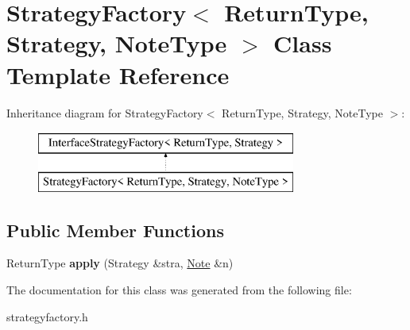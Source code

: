 \hypertarget{class_strategy_factory}{\section{Strategy\-Factory$<$ Return\-Type, Strategy, Note\-Type $>$ Class Template Reference}
\label{class_strategy_factory}
}
Inheritance diagram for Strategy\-Factory$<$ Return\-Type, Strategy, Note\-Type $>$\-:\begin{figure}[H]
\begin{center}
\leavevmode
\includegraphics[height=2.000000cm]{class_strategy_factory}
\end{center}
\end{figure}
\subsection*{Public Member Functions}
\begin{DoxyCompactItemize}
\item 
\hypertarget{class_strategy_factory_a5d5e278ab59075619df5aa563fb2b254}{Return\-Type {\bfseries apply} (Strategy \&stra, \hyperlink{class_note}{Note} \&n)}\label{class_strategy_factory_a5d5e278ab59075619df5aa563fb2b254}

\end{DoxyCompactItemize}


The documentation for this class was generated from the following file\-:\begin{DoxyCompactItemize}
\item 
strategyfactory.\-h\end{DoxyCompactItemize}
